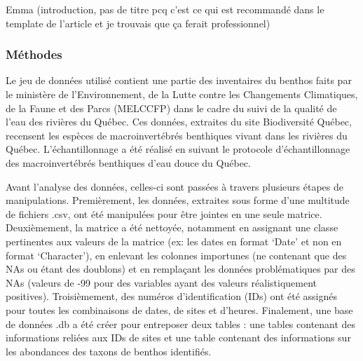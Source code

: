 \documentclass[9pt,twocolumn,twoside,]{pnas-new}
\begin{document}
Emma (introduction, pas de titre pcq c'est ce qui est recommandé dans le
template de l'article et je trouvais que ça ferait professionnel)

\hypertarget{muxe9thodes}{%
\subsubsection*{Méthodes}\label{muxe9thodes}}

Le jeu de données utilisé contient une partie des inventaires du benthos
faits par le ministère de l'Environnement, de la Lutte contre les
Changements Climatiques, de la Faune et des Parcs (MELCCFP) dans le
cadre du suivi de la qualité de l'eau des rivières du Québec. Ces
données, extraites du site Biodiversité Québec, recensent les espèces de
macroinvertébrés benthiques vivant dans les rivières du Québec.
L'échantillonnage a été réalisé en suivant le protocole
d'échantillonnage des macroinvertébrés benthiques d'eau douce du Québec.

Avant l'analyse des données, celles-ci sont passées à travers plusieurs
étapes de manipulations. Premièrement, les données, extraites sous forme
d'une multitude de fichiers .csv, ont été manipulées pour être jointes
en une seule matrice. Deuxièmement, la matrice a été nettoyée, notamment
en assignant une classe pertinentes aux valeurs de la matrice (ex: les
dates en format `Date' et non en format `Character'), en enlevant les
colonnes importunes (ne contenant que des NAs ou étant des doublons) et
en remplaçant les données problématiques par des NAs (valeurs de -99
pour des variables ayant des valeurs réalistiquement positives).
Troisièmement, des numéros d'identification (IDs) ont été assignés pour
toutes les combinaisons de dates, de sites et d'heures. Finalement, une
base de données .db a été créer pour entreposer deux tables : une tables
contenant des informations reliées aux IDs de sites et une table
contenant des informations sur les abondances des taxons de benthos
identifiés.
\end{document}
